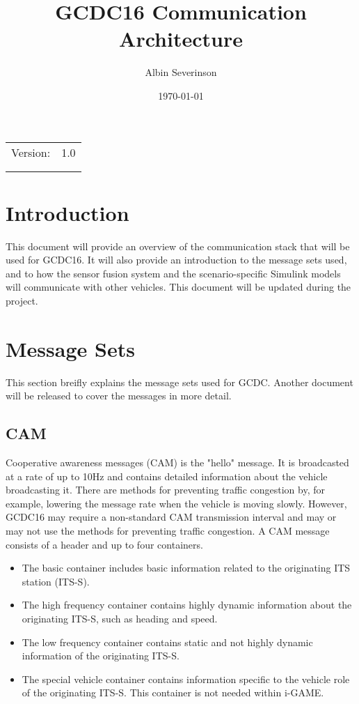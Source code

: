 \documentclass[11pt]{article}
\author{Albin Severinson}
\date{\today}
\title{GCDC16 Communication Architecture}
\begin{document}
\maketitle
\tableofcontents

\begin{center}
\begin{tabular}{lr}
Version: & 1.0\\
 & \\
 & \\
\end{tabular}
\end{center}

\newpage
\section{Introduction}
\label{sec-1}
This document will provide an overview of the communication stack that
will be used for GCDC16. It will also provide an introduction to the
message sets used, and to how the sensor fusion system and the
scenario-specific Simulink models will communicate with other
vehicles. This document will be updated during the project.

\section{Message Sets}
\label{sec-2}
This section breifly explains the message sets used for GCDC. Another
document will be released to cover the messages in more detail.

\subsection{CAM}
\label{sec-2-1}
Cooperative awareness messages (CAM) is the "hello" message. It is
broadcasted at a rate of up to 10Hz and contains detailed information
about the vehicle broadcasting it. There are methods for preventing
traffic congestion by, for example, lowering the message rate when the
vehicle is moving slowly. However, GCDC16 may require a non-standard
CAM transmission interval and may or may not use the methods for
preventing traffic congestion. A CAM message consists of a
header and up to four containers.

\begin{itemize}
\item The basic container includes basic information related to the
originating ITS station (ITS-S).
\item The high frequency container contains highly dynamic information
about the originating ITS-S, such as heading and speed.
\item The low frequency container contains static and not highly dynamic
information of the originating ITS-S.
\item The special vehicle container contains information specific to the
vehicle role of the originating ITS-S. This container is not needed
within i-GAME.
\end{itemize}
\end{document}

